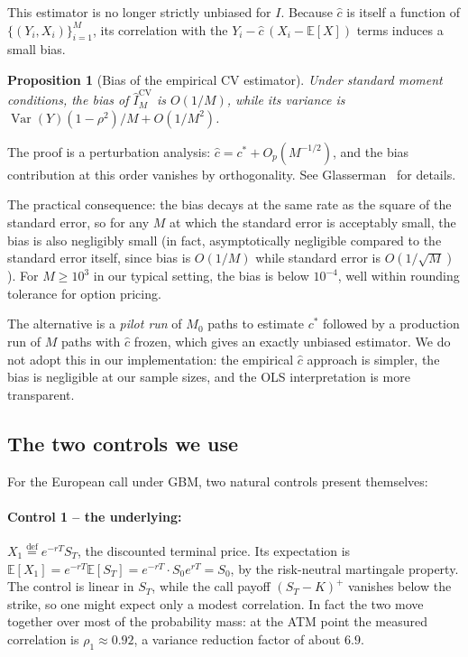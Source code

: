 \documentclass[11pt,a4paper]{article}
\theoremstyle{plain}
\newtheorem{proposition}[theorem]{Proposition}
\theoremstyle{definition}
\theoremstyle{remark}
\newcommand{\E}{\mathbb{E}}
\newcommand{\Var}{\operatorname{Var}}
\newcommand{\eqdef}{\overset{\mathrm{def}}{=}}
\begin{document}
This estimator is no longer strictly unbiased for $I$. Because
$\hat c$ is itself a function of $\{(Y_i, X_i)\}_{i=1}^M$, its
correlation with the $Y_i - \hat c\,(X_i - \E[X])$ terms induces a
small bias.

\begin{proposition}[Bias of the empirical CV estimator]
\label{prop:cv-bias}
Under standard moment conditions, the bias of $\hat I_M^{\mathrm{CV}}$
is $O(1/M)$, while its variance is $\Var(Y)(1-\rho^2)/M + O(1/M^2)$.
\end{proposition}

The proof is a perturbation analysis: $\hat c = c^* + O_p(M^{-1/2})$,
and the bias contribution at this order vanishes by orthogonality.
See Glasserman~\cite[Section~4.1.3]{Glasserman} for details.

The practical consequence: the bias decays at the same rate as the
square of the standard error, so for any $M$ at which
the standard error is acceptably small, the bias is also negligibly
small (in fact, asymptotically negligible compared to the standard
error itself, since bias is $O(1/M)$ while standard error is
$O(1/\sqrt M)$). For $M \geq 10^3$ in our typical setting, the bias
is below $10^{-4}$, well within rounding tolerance for option
pricing.

The alternative is a \emph{pilot run} of $M_0$ paths to estimate $c^*$
followed by a production run of $M$ paths with $\hat c$ frozen, which
gives an exactly unbiased estimator. We do not adopt this in our
implementation: the empirical $\hat c$ approach is simpler, the bias
is negligible at our sample sizes, and the OLS interpretation is
more transparent.

\subsection{The two controls we use}

For the European call under GBM, two natural controls present
themselves:

\paragraph{Control 1 -- the underlying:} $X_1 \eqdef e^{-rT} S_T$, the
discounted terminal price. Its expectation is $\E[X_1] = e^{-rT} \E[S_T]
= e^{-rT} \cdot S_0 e^{rT} = S_0$, by the risk-neutral martingale
property. The control is linear in $S_T$, while the call payoff
$(S_T - K)^+$ vanishes below the strike, so one might expect only a
modest correlation. In fact the two move together over most of the
probability mass: at the ATM point the measured correlation is
$\rho_1 \approx 0.92$, a variance reduction factor of about $6.9$.
\end{document}
